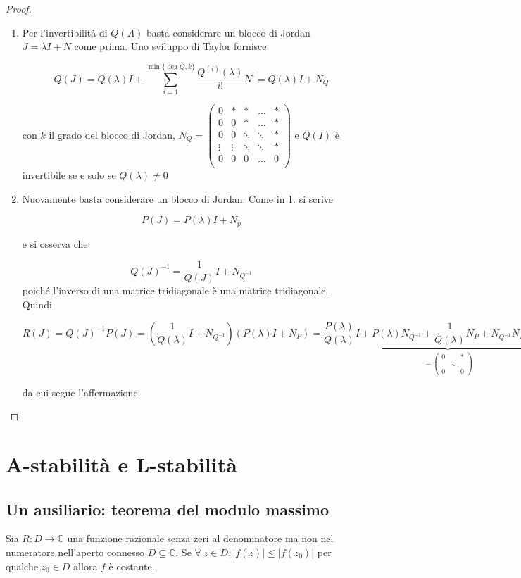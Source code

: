 \documentclass[hidelinks, 10pt]{report}
\begin{document}
\begin{proof}
\noindent
\begin{enumerate}
\item Per l'invertibilit\`a di $ Q(A) $ basta considerare un blocco di Jordan $ J = \lambda I + N $ come prima. Uno sviluppo di Taylor fornisce

\[ Q(J) = Q(\lambda) I + \sum\limits_{i = 1}^{\min \{\deg Q, k \}} \frac{Q^{(i)}(\lambda)}{i!} N^{i} = Q(\lambda) I + N_{Q} \]

con $ k $ il grado del blocco di Jordan, $ N_{Q} = \begin{pmatrix}
0 & \ast & \ast & \ldots & \ast \\
0 & 0 & \ast & \ldots & \ast \\
0 & 0 & \ddots & \ddots & \ast \\
\vdots & \vdots & \ddots & \ddots & \ast \\
0 & 0 & 0 & \ldots & 0 \\\end{pmatrix} $ e $ Q(I) $ \`e invertibile se e solo se $ Q(\lambda) \ne 0 $
\item Nuovamente basta considerare un blocco di Jordan. Come in 1. si scrive

\[ P(J) = P(\lambda) I + N_{p} \]

e si osserva che

\[ Q(J)^{-1} = \frac{1}{Q(J)} I  + N_{Q^{-1}} \]
poich\'e l'inverso di una matrice tridiagonale \`e una matrice tridiagonale. Quindi

\[ R(J) = Q(J)^{-1} P(J) = \left( \frac{1}{Q(\lambda)} I + N_{Q^{-1}} \right) \left( P(\lambda)I + N_{P}  \right) = \frac{P(\lambda)}{Q(\lambda)} I  + \underbrace{P(\lambda) N_{Q^{-1}} + \frac{1}{Q(\lambda)} N_{P} + N_{Q^{-1}} N_{P}}_{= \begin{pmatrix} 0 &   & \ast \\ & \ddots & \\0 &  & 0 \end{pmatrix}} \]

da cui segue l'affermazione.
\end{enumerate}
\end{proof}

\section{A-stabilit\`a e L-stabilit\`a}
\subsection{Un ausiliario: teorema del modulo massimo}	\label{section:24.1}
Sia $ R: D \to \mathbb{C} $ una funzione razionale senza zeri al denominatore ma non nel numeratore nell'aperto connesso $ D \subseteq \mathbb{C} $. Se $ \forall\ z \in D, \vert f(z) \vert \le \vert f(z_{0}) \vert $ per qualche $ z_{0} \in D $ allora $ f $ \`e costante.
\end{document}
